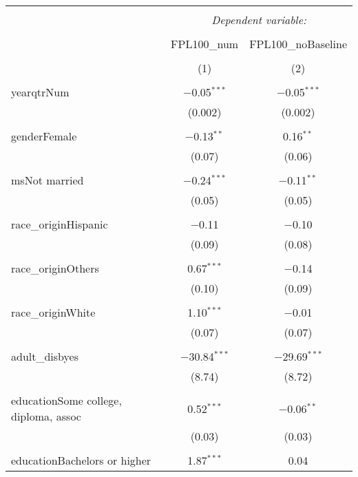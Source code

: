 \documentclass[11pt]{extarticle} %
\begin{document}
\begin{table}[!htbp] \centering 
\tiny
  \caption{} 
  \label{} 
\begin{tabular}{@{\extracolsep{5pt}}lcc} 
\\[-1.8ex]\hline 
\hline \\[-1.8ex] 
 & \multicolumn{2}{c}{\textit{Dependent variable:}} \\ 
\cline{2-3} 
\\[-1.8ex] & FPL100\_num & FPL100\_noBaseline \\ 
\\[-1.8ex] & (1) & (2)\\ 
\hline \\[-1.8ex] 
 yearqtrNum & $-$0.05$^{***}$ & $-$0.05$^{***}$ \\ 
  & (0.002) & (0.002) \\ 
  & & \\ 
 genderFemale & $-$0.13$^{**}$ & 0.16$^{**}$ \\ 
  & (0.07) & (0.06) \\ 
  & & \\ 
 msNot married & $-$0.24$^{***}$ & $-$0.11$^{**}$ \\ 
  & (0.05) & (0.05) \\ 
  & & \\ 
 race\_originHispanic & $-$0.11 & $-$0.10 \\ 
  & (0.09) & (0.08) \\ 
  & & \\ 
 race\_originOthers & 0.67$^{***}$ & $-$0.14 \\ 
  & (0.10) & (0.09) \\ 
  & & \\ 
 race\_originWhite & 1.10$^{***}$ & $-$0.01 \\ 
  & (0.07) & (0.07) \\ 
  & & \\ 
 adult\_disbyes & $-$30.84$^{***}$ & $-$29.69$^{***}$ \\ 
  & (8.74) & (8.72) \\ 
  & & \\ 
 educationSome college, diploma, assoc & 0.52$^{***}$ & $-$0.06$^{**}$ \\ 
  & (0.03) & (0.03) \\ 
  & & \\ 
 educationBachelors or higher & 1.87$^{***}$ & 0.04 \\ 

\end{tabular}
\end{table}
\end{document}
